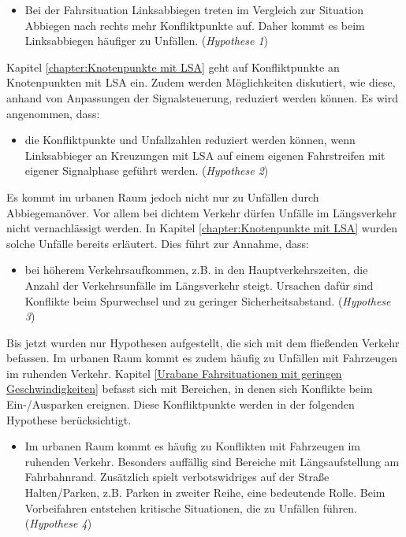 \begin{itemize}
	\item Bei der Fahrsituation Linksabbiegen treten im Vergleich zur Situation Abbiegen nach rechts mehr Konfliktpunkte auf. Daher kommt es beim Linksabbiegen häufiger zu Unfällen. (\textit{Hypothese 1})
\end{itemize}

Kapitel \ref{chapter:Knotenpunkte mit LSA} geht auf Konfliktpunkte an Knotenpunkten mit LSA ein. Zudem werden Möglichkeiten diskutiert, wie diese, anhand von Anpassungen der Signalsteuerung, reduziert werden können. Es wird angenommen, dass:
	
\begin{itemize}	
	\item die Konfliktpunkte und Unfallzahlen reduziert werden können, wenn Linksabbieger an Kreuzungen mit \ac{LSA} auf einem eigenen Fahrstreifen mit eigener Signalphase geführt werden. (\textit{Hypothese 2})
\end{itemize}

Es kommt im urbanen Raum jedoch nicht nur zu Unfällen durch Abbiegemanöver. Vor allem bei dichtem Verkehr dürfen Unfälle im Längsverkehr nicht vernachlässigt werden. In Kapitel \ref{chapter:Knotenpunkte mit LSA} wurden solche Unfälle bereits erläutert. Dies führt zur Annahme, dass:

\begin{itemize}	
	\item bei höherem Verkehrsaufkommen, z.B. in den Hauptverkehrszeiten, die Anzahl der Verkehrsunfälle im Längsverkehr steigt. Ursachen dafür sind Konflikte beim Spurwechsel und zu geringer Sicherheitsabstand. (\textit{Hypothese 3})
\end{itemize}	

Bis jetzt wurden nur Hypothesen aufgestellt, die sich mit dem fließenden Verkehr befassen. Im urbanen Raum kommt es zudem häufig zu Unfällen mit Fahrzeugen im ruhenden Verkehr. Kapitel \ref{Urabane Fahrsituationen mit geringen Geschwindigkeiten} befasst sich mit Bereichen, in denen sich Konflikte beim Ein-/Ausparken ereignen. Diese Konfliktpunkte werden in der folgenden Hypothese berücksichtigt.

\begin{itemize}	
	\item Im urbanen Raum kommt es häufig zu Konflikten mit Fahrzeugen im ruhenden Verkehr. Besonders auffällig sind Bereiche mit Längsaufstellung am Fahrbahnrand. Zusätzlich spielt verbotswidriges auf der Straße Halten/Parken, z.B. Parken in zweiter Reihe, eine bedeutende Rolle. Beim Vorbeifahren entstehen kritische Situationen, die zu Unfällen führen. (\textit{Hypothese 4})
\end{itemize}

